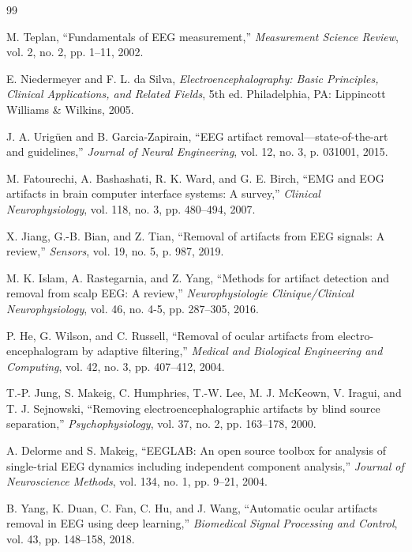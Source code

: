 \documentclass[journal]{IEEEtran}
\begin{document}
\begin{thebibliography}{99}

M. Teplan, ``Fundamentals of EEG measurement,'' \textit{Measurement Science Review}, vol. 2, no. 2, pp. 1--11, 2002.

E. Niedermeyer and F. L. da Silva, \textit{Electroencephalography: Basic Principles, Clinical Applications, and Related Fields}, 5th ed. Philadelphia, PA: Lippincott Williams \& Wilkins, 2005.

J. A. Urig\"{u}en and B. Garcia-Zapirain, ``EEG artifact removal---state-of-the-art and guidelines,'' \textit{Journal of Neural Engineering}, vol. 12, no. 3, p. 031001, 2015.

M. Fatourechi, A. Bashashati, R. K. Ward, and G. E. Birch, ``EMG and EOG artifacts in brain computer interface systems: A survey,'' \textit{Clinical Neurophysiology}, vol. 118, no. 3, pp. 480--494, 2007.

X. Jiang, G.-B. Bian, and Z. Tian, ``Removal of artifacts from EEG signals: A review,'' \textit{Sensors}, vol. 19, no. 5, p. 987, 2019.

M. K. Islam, A. Rastegarnia, and Z. Yang, ``Methods for artifact detection and removal from scalp EEG: A review,'' \textit{Neurophysiologie Clinique/Clinical Neurophysiology}, vol. 46, no. 4-5, pp. 287--305, 2016.

P. He, G. Wilson, and C. Russell, ``Removal of ocular artifacts from electro-encephalogram by adaptive filtering,'' \textit{Medical and Biological Engineering and Computing}, vol. 42, no. 3, pp. 407--412, 2004.

T.-P. Jung, S. Makeig, C. Humphries, T.-W. Lee, M. J. McKeown, V. Iragui, and T. J. Sejnowski, ``Removing electroencephalographic artifacts by blind source separation,'' \textit{Psychophysiology}, vol. 37, no. 2, pp. 163--178, 2000.

A. Delorme and S. Makeig, ``EEGLAB: An open source toolbox for analysis of single-trial EEG dynamics including independent component analysis,'' \textit{Journal of Neuroscience Methods}, vol. 134, no. 1, pp. 9--21, 2004.

B. Yang, K. Duan, C. Fan, C. Hu, and J. Wang, ``Automatic ocular artifacts removal in EEG using deep learning,'' \textit{Biomedical Signal Processing and Control}, vol. 43, pp. 148--158, 2018.


\end{thebibliography}
\end{document}
